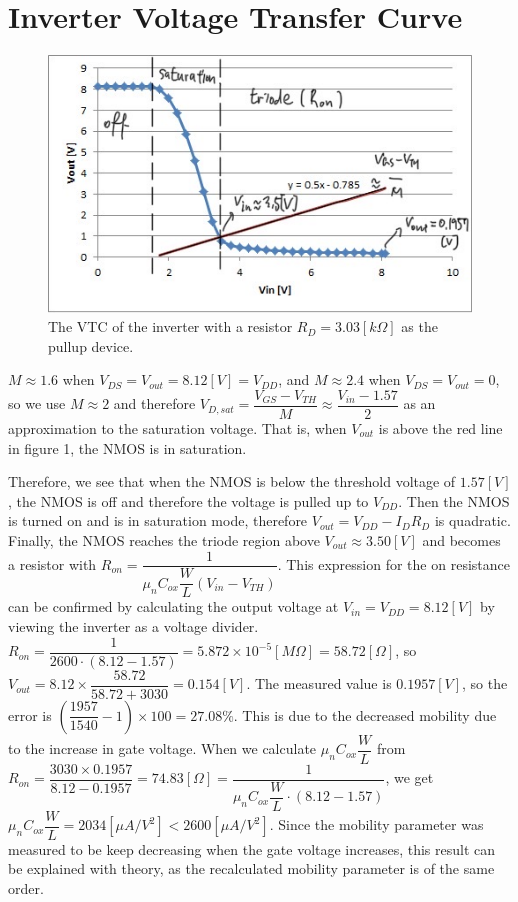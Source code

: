 \documentclass[a4paper, itemph]{oblivoir}
\theoremstyle{definition}
\begin{document}
\section{Inverter Voltage Transfer Curve}

\begin{figure}[htb]
    \centering
    \includegraphics[width=0.5\linewidth]{vtc.JPG}
    \caption{The VTC of the inverter with a resistor $R_D=3.03[k\Omega]$ as the pullup device.}
\end{figure}

$M\approx 1.6$ when $V_{DS}=V_{out}=8.12[V]=V_{DD}$, and $M\approx 2.4$ when $V_{DS}=V_{out}=0$, so we use $M\approx 2$ and therefore $V_{D,sat}=\dfrac{V_{GS}-V_{TH}}{M}\approx \dfrac{V_{in}-1.57}{2}$ as an approximation to the saturation voltage. That is, when $V_{out}$ is above the red line in figure 1, the NMOS is in saturation.

Therefore, we see that when the NMOS is below the threshold voltage of $1.57[V]$, the NMOS is off and therefore the voltage is pulled up to $V_{DD}$. Then the NMOS is turned on and is in saturation mode, therefore $V_{out}=V_{DD}-I_DR_D$ is quadratic. Finally, the NMOS reaches the triode region above $V_{out}\approx 3.50[V]$ and becomes a resistor with $R_{on}=\dfrac{1}{\mu_n C_{ox}\dfrac{W}{L}(V_{in}-V_{TH})}$. This expression for the on resistance can be confirmed by calculating the output voltage at $V_{in}=V_{DD}=8.12[V]$ by viewing the inverter as a voltage divider. $R_{on}=\dfrac{1}{2600\cdot (8.12-1.57)}=5.872\times 10^{-5}[M\Omega ]=58.72[\Omega]$, so $V_{out}=8.12\times \dfrac{58.72}{58.72+3030}=0.154[V]$. The measured value is $0.1957[V]$, so the error is $(\dfrac{1957}{1540}-1)\times 100=27.08\%$. This is due to the decreased mobility due to the increase in gate voltage. When we calculate $\mu_n C_{ox}\dfrac{W}{L}$ from $R_{on}=\dfrac{3030\times 0.1957}{8.12-0.1957}=74.83[\Omega]=\dfrac{1}{\mu_n C_{ox}\dfrac{W}{L}\cdot (8.12-1.57)}$, we get $\mu_n C_{ox}\dfrac{W}{L}=2034[\mu A/V^2]<2600[\mu A/V^2]$. Since the mobility parameter was measured to be keep decreasing when the gate voltage increases, this result can be explained with theory, as the recalculated mobility parameter is of the same order.
\end{document}
